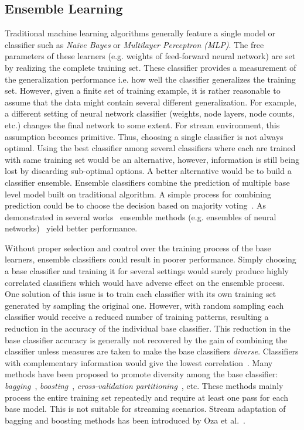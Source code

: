 \subsection{Ensemble Learning}
Traditional machine learning algorithms generally feature a single model or classifier such as \textit{Na\"ive Bayes} or \textit{Multilayer Perceptron (MLP)}. The free parameters of these learners (e.g. weights of feed-forward neural network) are set by realizing the complete training set. These classifier provides a measurement of the generalization performance i.e. how well the classifier generalizes the training set. However, given a finite set of training example, it is rather reasonable to assume that the data might contain several different generalization. For example, a different setting of neural network classifier (weights, node layers, node counts, etc.) changes the final network to some extent. For stream environment, this assumption becomes primitive. Thus, choosing a single classifier is not always optimal. Using the best classifier among several classifiers where each are trained with same training set would be an alternative, however, information is still being lost by discarding sub-optimal options. A better alternative would be to build a classifier ensemble. Ensemble classifiers combine the prediction of multiple base level model built on traditional algorithm. A simple process for combining prediction could be to choose the decision based on majority voting~\cite{parhami94:voting}. As demonstrated in several works~\cite{breiman93:regression, schapire90:whyens, wolpert92:whyens} ensemble methods (e.g. ensembles of neural networks)~\cite{hansen90:ensNN, tumer99:whyens} yield better performance. 

Without proper selection and control over the training process of the base learners, ensemble classifiers could result in poorer performance. Simply choosing a base classifier and training it for several settings would surely produce highly correlated classifiers which would have adverse effect on the ensemble process. One solution of this issue is to train each classifier with its own training set generated by sampling the original one. However, with random sampling each classifier would receive a reduced number of training patterns, resulting a reduction in the accuracy of the individual base classifier. This reduction in the base classifier accuracy is generally not recovered by the gain of combining the classifier unless measures are taken to make the base classifiers \textit{diverse}. Classifiers with complementary information would give the lowest correlation~\cite{breiman93:regression, tumer99:whyens}. Many methods have been proposed to promote diversity among the base classifier: \textit{bagging}~\cite{breiman94:bagging}, \textit{boosting}~\cite{drucker94:boosting, freund97:boosting, oza99:whyens}, \textit{cross-validation partitioning}~\cite{krogh95:ensNNcv, tumer99:whyens}, etc. These methods mainly process the entire training set repeatedly and require at least one pass for each base model. This is not suitable for streaming scenarios. Stream adaptation of bagging and boosting methods has been introduced by Oza et al.~\cite{oza01:obagboost,oza01:thesis}.


